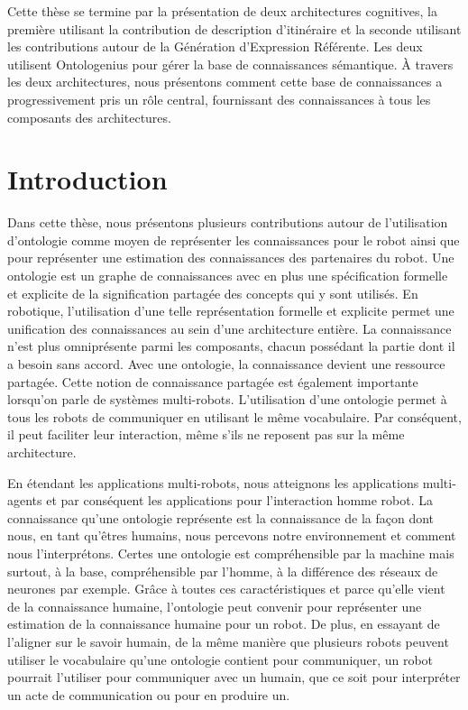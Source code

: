 Cette thèse se termine par la présentation de deux architectures cognitives, la première utilisant la contribution de description d'itinéraire et la seconde utilisant les contributions autour de la Génération d'Expression Référente. Les deux utilisent Ontologenius pour gérer la base de connaissances sémantique. À travers les deux architectures, nous présentons comment cette base de connaissances a progressivement pris un rôle central, fournissant des connaissances à tous les composants des architectures.


\section*{Introduction}

Dans cette thèse, nous présentons plusieurs contributions autour de l'utilisation d'ontologie comme moyen de représenter les connaissances pour le robot ainsi que pour représenter une estimation des connaissances des partenaires du robot. Une ontologie est un graphe de connaissances avec en plus une spécification formelle et explicite de la signification partagée des concepts qui y sont utilisés. En robotique, l'utilisation d'une telle représentation formelle et explicite permet une unification des connaissances au sein d'une architecture entière. La connaissance n'est plus omniprésente parmi les composants, chacun possédant la partie dont il a besoin sans accord. Avec une ontologie, la connaissance devient une ressource partagée. Cette notion de connaissance partagée est également importante lorsqu'on parle de systèmes multi-robots. L'utilisation d'une ontologie permet à tous les robots de communiquer en utilisant le même vocabulaire. Par conséquent, il peut faciliter leur interaction, même s'ils ne reposent pas sur la même architecture.

En étendant les applications multi-robots, nous atteignons les applications multi-agents et par conséquent les applications pour l'interaction homme robot. La connaissance qu'une ontologie représente est la connaissance de la façon dont nous, en tant qu'êtres humains, nous percevons notre environnement et comment nous l'interprétons. Certes une ontologie est compréhensible par la machine mais surtout, à la base, compréhensible par l'homme, à la différence des réseaux de neurones par exemple. Grâce à toutes ces caractéristiques et parce qu'elle vient de la connaissance humaine, l'ontologie peut convenir pour représenter une estimation de la connaissance humaine pour un robot. De plus, en essayant de l'aligner sur le savoir humain, de la même manière que plusieurs robots peuvent utiliser le vocabulaire qu'une ontologie contient pour communiquer, un robot pourrait l'utiliser pour communiquer avec un humain, que ce soit pour interpréter un acte de communication ou pour en produire un. 

